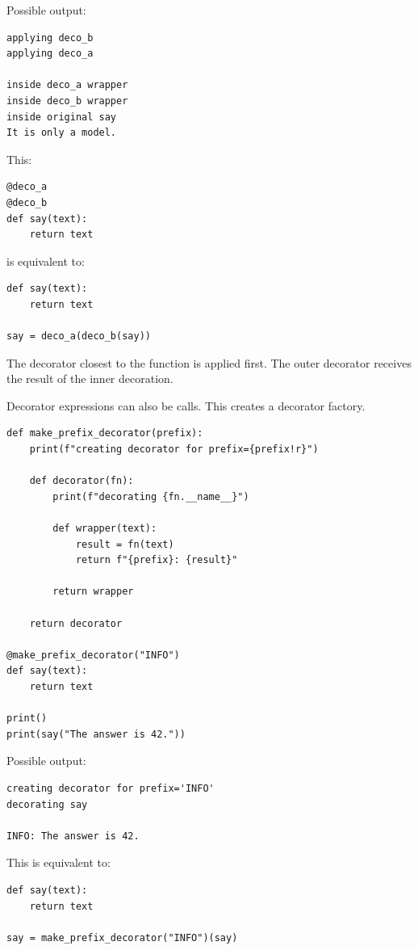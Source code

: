 Possible output:

\begin{verbatim}
applying deco_b
applying deco_a

inside deco_a wrapper
inside deco_b wrapper
inside original say
It is only a model.
\end{verbatim}

This:

\begin{verbatim}
@deco_a
@deco_b
def say(text):
    return text
\end{verbatim}

is equivalent to:

\begin{verbatim}
def say(text):
    return text

say = deco_a(deco_b(say))
\end{verbatim}

The decorator closest to the function is applied first. The outer decorator receives the result of the inner decoration.

Decorator expressions can also be calls. This creates a decorator factory.

\begin{verbatim}
def make_prefix_decorator(prefix):
    print(f"creating decorator for prefix={prefix!r}")

    def decorator(fn):
        print(f"decorating {fn.__name__}")

        def wrapper(text):
            result = fn(text)
            return f"{prefix}: {result}"

        return wrapper

    return decorator

@make_prefix_decorator("INFO")
def say(text):
    return text

print()
print(say("The answer is 42."))
\end{verbatim}

Possible output:

\begin{verbatim}
creating decorator for prefix='INFO'
decorating say

INFO: The answer is 42.
\end{verbatim}

This is equivalent to:

\begin{verbatim}
def say(text):
    return text

say = make_prefix_decorator("INFO")(say)
\end{verbatim}

